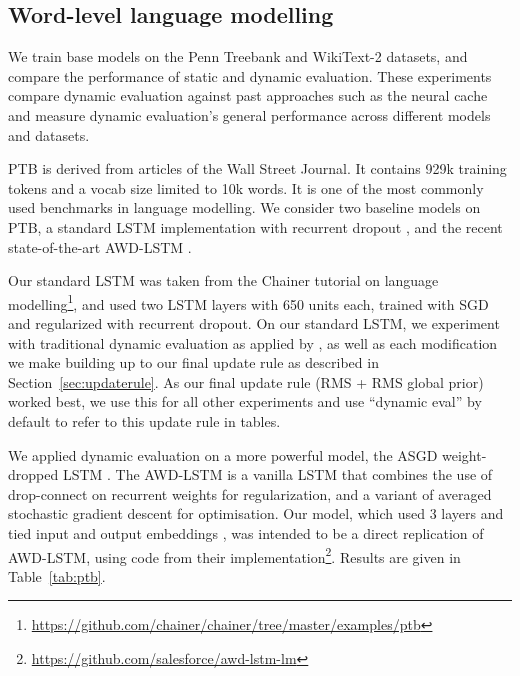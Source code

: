 \documentclass{article}
\begin{document}
\subsection{Word-level language modelling}
\label{sec:ptb}
We train base models on the Penn Treebank \citep[PTB,][]{marcus1993} and WikiText-2 \citep{Merity2016} datasets, and compare the performance of static and dynamic evaluation. These experiments compare dynamic evaluation against past approaches such as the neural cache and measure dynamic evaluation's general performance across different models and datasets. 

PTB is derived from articles of the Wall Street Journal. It contains 929k training tokens and a vocab size limited to 10k words. It is one of the most commonly used benchmarks in language modelling. We consider two baseline models on PTB, a standard LSTM implementation with recurrent dropout \citep{Zaremba-2014}, and the recent state-of-the-art AWD-LSTM \citep{merity2017}. 

Our standard LSTM was taken from the Chainer tutorial on language modelling\footnote{\url{https://github.com/chainer/chainer/tree/master/examples/ptb}}, and used two LSTM layers with 650 units each, trained with SGD and regularized with recurrent dropout. On our standard LSTM, we experiment with traditional dynamic evaluation as applied by \citet{mikolov2010}, as well as each modification we make building up to our final update rule as described in Section~\ref{sec:updaterule}. As our final update rule (RMS + RMS global prior) worked best, we use this for all other experiments and use ``dynamic eval'' by default to refer to this update rule in tables. 

We applied dynamic evaluation on a more powerful model, the ASGD weight-dropped LSTM \citep[AWD-LSTM,][]{merity2017}. The AWD-LSTM is a vanilla LSTM that combines the use of drop-connect \citep{wan2013} on recurrent weights for regularization, and a variant of averaged stochastic gradient descent \citep{polyak1992} for optimisation. Our model, which used 3 layers and tied input and output embeddings \citep{press2017,inan2017}, was intended to be a direct replication of AWD-LSTM, using code from their implementation\footnote{\url{https://github.com/salesforce/awd-lstm-lm}}. Results are given in Table~\ref{tab:ptb}.
\end{document}
